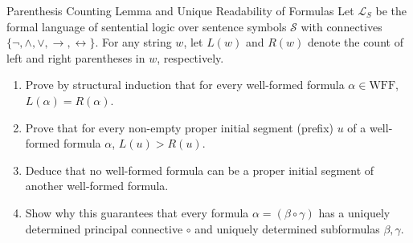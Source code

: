 \begin{exercise}{Parenthesis Counting Lemma and Unique Readability of Formulas}
Let $\mathcal{L}_S$ be the formal language of sentential logic over sentence symbols $\mathcal{S}$ with connectives $\{\neg, \land, \lor, \to, \leftrightarrow\}$.
For any string $w$, let $L(w)$ and $R(w)$ denote the count of left and right parentheses in $w$, respectively.
\begin{enumerate}[leftmargin=1.5em,itemsep=2pt]
  \item Prove by structural induction that for every well-formed formula $\alpha \in \mathrm{WFF}$, $L(\alpha) = R(\alpha)$.
  \item Prove that for every non-empty proper initial segment (prefix) $u$ of a well-formed formula $\alpha$, $L(u) > R(u)$.
  \item Deduce that no well-formed formula can be a proper initial segment of another well-formed formula.
  \item Show why this guarantees that every formula $\alpha = (\beta \circ \gamma)$ has a uniquely determined principal connective $\circ$ and uniquely determined subformulas $\beta, \gamma$.
\end{enumerate}
\end{exercise}

\begin{tabletworkspace}[5.0cm]
\end{tabletworkspace}

